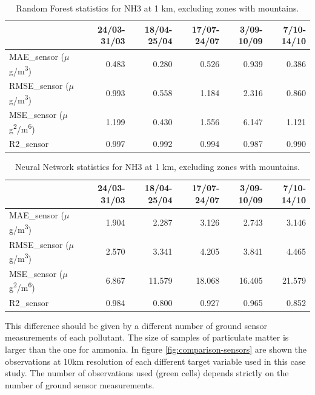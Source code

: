 \begin{table}[H]
\begin{tabular}{lrrrrr}
\toprule
  &  24/03-31/03 &  18/04-25/04 &  17/07-24/07 &  3/09-10/09 &  7/10-14/10 \\
\midrule
 MAE\_sensor ($\mu$g/m\textsuperscript{3}) &        0.483 &        0.280 &        0.526 &       0.939 &       0.386 \\
RMSE\_sensor ($\mu$g/m\textsuperscript{3}) &        0.993 &        0.558 &        1.184 &       2.316 &       0.860 \\
 MSE\_sensor ($\mu$g\textsuperscript{2}/m\textsuperscript{6}) &        1.199 &        0.430 &        1.556 &       6.147 &       1.121 \\
  R2\_sensor  &        0.997 &        0.992 &        0.994 &       0.987 &       0.990 \\
\bottomrule
\end{tabular}
\caption{Random Forest statistics for NH3 at 1 km, excluding zones with mountains.}
\label{tab:nh3RF}
\end{table}
\begin{table}[H]
\begin{tabular}{lrrrrr}
\toprule
  &  24/03-31/03 &  18/04-25/04 &  17/07-24/07 &  3/09-10/09 &  7/10-14/10 \\
\midrule
 MAE\_sensor ($\mu$g/m\textsuperscript{3})&        1.904 &        2.287 &        3.126 &       2.743 &       3.146 \\
RMSE\_sensor ($\mu$g/m\textsuperscript{3}) &        2.570 &        3.341 &        4.205 &       3.841 &       4.465 \\
 MSE\_sensor ($\mu$g\textsuperscript{2}/m\textsuperscript{6}) &        6.867 &       11.579 &       18.068 &      16.405 &      21.579 \\
  R2\_sensor &        0.984 &        0.800 &        0.927 &       0.965 &       0.852 \\
\bottomrule
\end{tabular}
\caption{Neural Network statistics for NH3 at 1 km, excluding zones with mountains.}
\label{tab:nh3NN}
\end{table}
This difference should be given by a different number of ground sensor measurements of each pollutant. The size of samples of particulate matter is larger than the one for ammonia.
In figure \ref{fig:comparison-sensors} are shown the observations at 10km resolution of each different target variable used in this case study. The number of observations used (green cells) depends strictly on the number of ground sensor measurements. \\
